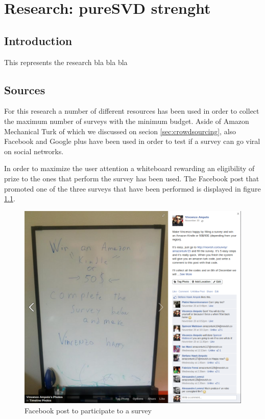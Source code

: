 \chapter{Research: pureSVD strenght}
\label{chapter:<research_puresvd_strenght>}

\section{Introduction}
\label{sec:research_introduction}

This represents the research bla bla bla

\section{Sources}
\label{sec:research_sources}

For this research a number of different resources has been used in order to collect the maximum number of surveys with the minimum budget. Aside of Amazon Mechanical Turk of which we discussed on secion \ref{sec:crowdsourcing}, also Facebook and Google plus have been used in order to test if a survey can go viral on social networks.

In order to maximize the user attention a whiteboard rewarding an eligibility of prize to the ones that perform the survey has been used. The Facebook post that promoted one of the three surveys that have been performed is displayed in figure \ref{fig:facebook_survey}.

\begin{figure}
  \centering
  \includegraphics[width=\textwidth]{figures/facebook_survey.png}
  \caption{Facebook post to participate to a survey}
  \label{fig:facebook_survey}
\end{figure}

